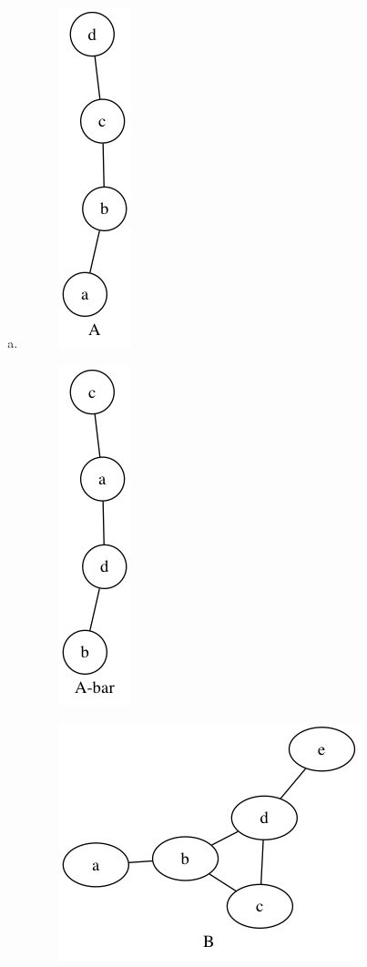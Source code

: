 \begin{enumerate}[(a)]
	\item 

        \begin{figure}[H]
        \centering
        \includegraphics[scale=0.5]{118/1.png}
        \end{figure}

        \begin{figure}[H]
        \centering
        \includegraphics[scale=0.5]{118/1i.png}
        \end{figure}

        \begin{figure}[H]
        \centering
        \includegraphics[scale=0.5]{118/2.png}
        \end{figure}


\end{enumerate}
